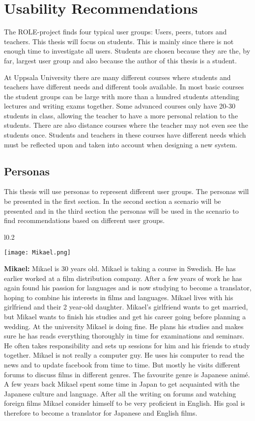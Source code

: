 \section {Usability Recommendations}
The ROLE-project finds four typical user groups: Users, peers, tutors and teachers. \cite{chatterjee} This thesis will focus on students. This is mainly since there is not enough time to investigate all users. Students are chosen because they are the, by far, largest user group and also because the author of this thesis is a student.

At Uppsala University there are many different courses where students and teachers have different needs and different tools available. In most basic courses the student groups can be large with more than a hundred students attending lectures and writing exams together. Some advanced courses only have 20-30 students in class, allowing the teacher to have a more personal relation to the students. There are also distance courses where the teacher may not even see the students once. Students and teachers in these courses have different needs which must be reflected upon and taken into account when designing a new system.

\subsection {Personas}
This thesis will use personas to represent different user groups. The personas will be presented in the first section. In the second section a scenario will be presented and in the third section the personas will be used in the scenario to find recommendations based on different user groups.

\begin{wrapfigure}{l}{0.2\textwidth}
  \begin{center}
    \texttt{[image: Mikael.png]}
  \end{center}
\end{wrapfigure}
\textbf {Mikael:} Mikael is 30 years old. Mikael is taking a course in Swedish. He has earlier worked at a film distribution company. After a few years of work he has again found his passion for languages and is now studying to become a translator, hoping to combine his interests in films and languages. Mikael lives with his girlfriend and their 2 year-old daughter. Mikael's girlfriend wants to get married, but Mikael wants to finish his studies and get his career going before planning a wedding.
At the university Mikael is doing fine. He plans his studies and makes sure he has reads everything thoroughly in time for examinations and seminars. He often takes responsibility and sets up sessions for him and his friends to study together.
Mikael is not really a computer guy. He uses his computer to read the news and to update facebook from time to time. But mostly he visits different forums to discuss films in different genres. The favourite genre is Japanese animé. A few years back Mikael spent some time in Japan to get acquainted with the Japanese culture and language. After all the writing on forums and watching foreign films Mikael consider himself to be very proficient in English. His goal is therefore to become a translator for Japanese and English films.

